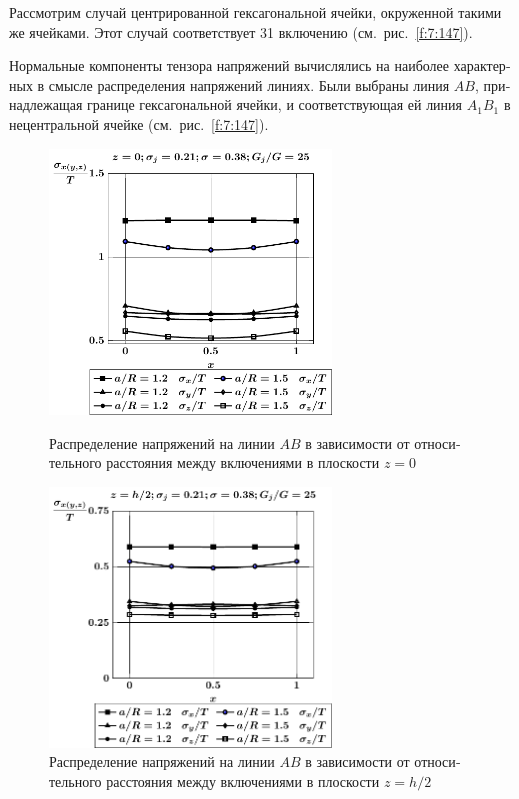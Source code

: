 \begin{russian}
Рассмотрим случай центрированной гексагональной ячейки, окруженной такими же ячейками. Этот случай соответствует 31 включению (см.~рис.~\ref{f:7:147}).


Нормальные компоненты тензора напряжений вычислялись на наиболее характерных в смысле распределения напряжений линиях. Были выбраны линия $AB$, принадлежащая границе гексагональной ячейки, и соответствующая ей линия $A_1B_1$ в нецентральной ячейке (см.~рис.~\ref{f:7:147}).

\begin{figure}[h!]
\centering\footnotesize
\parbox[b]{7.5cm}{\centering\includegraphics[width=7.5cm]{inc31-a-h10-r10-g25-z0.pdf}
\caption{Распределение напряжений на линии $AB$ в зависимости от относительного расстояния между включениями в плоскости $z=0$
\label{f:7:120}}}\hfil\hfil
\parbox[b]{7.5cm}{\centering\includegraphics[width=7.5cm]{inc31-a-h10-r10-g25-z1.pdf}
\caption{Распределение напряжений на линии $AB$ в зависимости от относительного расстояния между включениями в плоскости $z=h/2$
\label{f:7:121}}}
\end{figure}


\end{russian}
